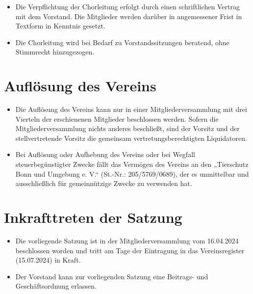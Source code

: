 \documentclass[12pt,paper=a4,ngerman]{report}
\begin{document}
\begin{itemize}
    \item Die Verpflichtung der Chorleitung erfolgt durch einen schriftlichen Vertrag mit dem Vorstand. Die Mitglieder werden darüber in angemessener Frist in Textform in Kenntnis gesetzt.
    \item Die Chorleitung wird bei Bedarf zu Vorstandssitzungen beratend, ohne Stimmrecht hinzugezogen.
\end{itemize}

\section{Auflösung des Vereins}

\begin{itemize}
    \item Die Auflösung des Vereins kann nur in einer Mitgliederversammlung mit drei Vierteln der erschienenen Mitglieder beschlossen werden. Sofern die Mitgliederversammlung nichts anderes beschließt, sind der Vorsitz und der stellvertretende Vorsitz die gemeinsam vertretungsberechtigten Liquidatoren.
    \item Bei Auflösung oder Aufhebung des Vereins oder bei Wegfall steuerbegünstigter Zwecke fällt das Vermögen des Vereins an den „Tierschutz Bonn und Umgebung e. V.“ (St.-Nr.: 205/5769/0689), der es unmittelbar und ausschließlich für gemeinnützige Zwecke zu verwenden hat.
\end{itemize}

\section{Inkrafttreten der Satzung}

\begin{itemize}
    \item Die vorliegende Satzung ist in der Mitgliederversammlung vom 16.04.2024 beschlossen worden und tritt am Tage der Eintragung in das Vereinsregister (15.07.2024) in Kraft.
    \item Der Vorstand kann zur vorliegenden Satzung eine Beitrags- und Geschäftsordnung erlassen.
\end{itemize}
\end{document}
